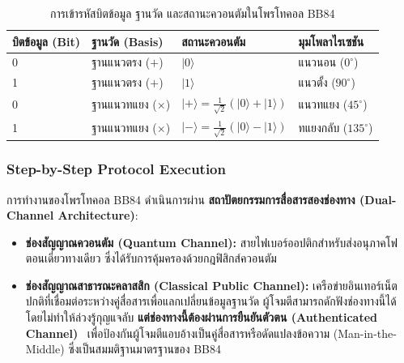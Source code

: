 \begin{table}[htbp]
\centering
\renewcommand{\arraystretch}{1.35}
\setlength{\extrarowheight}{2.5pt}
\begin{tabularx}{\textwidth}{>{\centering\arraybackslash}p{2.2cm} >{\centering\arraybackslash}p{3.2cm} >{\centering\arraybackslash}X >{\centering\arraybackslash}p{3.5cm}}
\hline
\textbf{บิตข้อมูล (Bit)} & \textbf{ฐานวัด (Basis)} & \textbf{สถานะควอนตัม} & \textbf{มุมโพลาไรเซชัน} \\ \hline
\rowcolor{white}
0 & ฐานแนวตรง ($+$) & $|0\rangle$ & แนวนอน ($0^\circ$) \\
\rowcolor[HTML]{E4E7EB}
1 & ฐานแนวตรง ($+$) & $|1\rangle$ & แนวตั้ง ($90^\circ$) \\
\rowcolor{white}
0 & ฐานแนวทแยง ($\times$) & $|+\rangle = \frac{1}{\sqrt{2}}(|0\rangle + |1\rangle)$ & แนวทแยง ($45^\circ$) \\
\rowcolor[HTML]{E4E7EB}
1 & ฐานแนวทแยง ($\times$) & $|-\rangle = \frac{1}{\sqrt{2}}(|0\rangle - |1\rangle)$ & ทแยงกลับ ($135^\circ$) \\ \hline
\end{tabularx}
\caption{การเข้ารหัสบิตข้อมูล ฐานวัด และสถานะควอนตัมในโพรโทคอล BB84}
\label{tab:bb84_encoding_simple}
\end{table}

\subsubsection{Step-by-Step Protocol Execution}
การทำงานของโพรโทคอล BB84 ดำเนินการผ่าน \textbf{สถาปัตยกรรมการสื่อสารสองช่องทาง (Dual-Channel Architecture)}:
\begin{itemize}
    \item \textbf{ช่องสัญญาณควอนตัม (Quantum Channel):} สายไฟเบอร์ออปติกสำหรับส่งอนุภาคโฟตอนเดี่ยวทางเดียว ซึ่งได้รับการคุ้มครองด้วยกฎฟิสิกส์ควอนตัม
    \item \textbf{ช่องสัญญาณสาธารณะคลาสสิก (Classical Public Channel):} เครือข่ายอินเทอร์เน็ตปกติที่เชื่อมต่อระหว่างคู่สื่อสารเพื่อแลกเปลี่ยนข้อมูลฐานวัด ผู้โจมตีสามารถดักฟังช่องทางนี้ได้ โดยไม่ทำให้ล่วงรู้กุญแจลับ \textbf{แต่ช่องทางนี้ต้องผ่านการยืนยันตัวตน (Authenticated Channel)}~\cite{wegman_carter_1981, scarani_qkd_practical} เพื่อป้องกันผู้โจมตีแอบอ้างเป็นคู่สื่อสารหรือดัดแปลงข้อความ (Man-in-the-Middle) ซึ่งเป็นสมมติฐานมาตรฐานของ BB84
\end{itemize}

